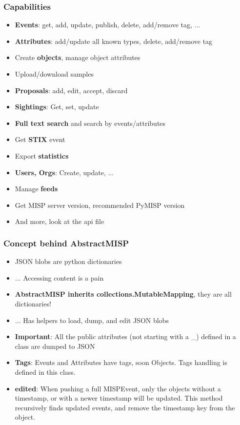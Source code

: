 \begin{frame}[fragile]
    \frametitle{Capabilities}
    \begin{itemize}
        \item {\bf Events}: get, add, update, publish, delete, add/remove tag, ...
        \item {\bf Attributes}: add/update all known types, delete, add/remove tag
        \item Create {\bf objects}, manage object attributes
        \item Upload/download samples
        \item {\bf Proposals}: add, edit, accept, discard
        \item {\bf Sightings}: Get, set, update
        \item {\bf Full text search} and search by events/attributes
        \item Get {\bf STIX} event
		\item Export {\bf statistics}
        \item {\bf Users, Orgs}: Create, update, ...
        \item Manage {\bf feeds}
        \item Get MISP server version, recommended PyMISP version
        \item And more, look at the api file
    \end{itemize}
\end{frame}

\begin{frame}[fragile]
    \frametitle{Concept behind AbstractMISP}
    \begin{itemize}
        \item JSON blobs are python dictionaries
        \item ... Accessing content is a pain
        \item {\bf AbstractMISP inherits collections.MutableMapping}, they are all dictionaries!
        \item ... Has helpers to load, dump, and edit JSON blobs
        \item {\bf Important}: All the public attributes (not starting with a \_) defined in a class are dumped to JSON
        \item {\bf Tags}: Events and Attributes have tags, soon Objects. Tags handling is defined in this class.
        \item {\bf edited}: When pushing a full MISPEvent, only the objects without a timestamp,
            or with a newer timestamp will be updated. This method recursively finds updated events,
            and remove the timestamp key from the object.
    \end{itemize}
\end{frame}


